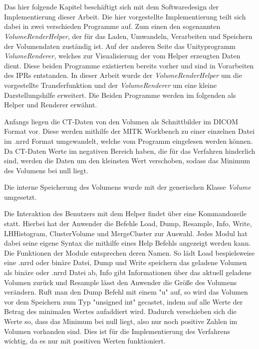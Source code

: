 \chapter{}
\label{sec:concept}



Das hier folgende Kapitel beschäftigt sich mit dem Softwaredesign der Implementierung dieser Arbeit.
\newline
Die hier vorgestellte Implementierung teilt sich dabei in zwei verschieden Programme auf. Zum einen den sogenannten \textit{VolumeRenderHelper}, der für das Laden, Umwandeln, Verarbeiten und Speichern der Volumendaten zuständig ist. Auf der anderen Seite das Unityprogramm \textit{VolumeRenderer}, welches zur Visualisierung der vom Helper erzeugten Daten dient. Diese beiden Programme existierten bereits vorher und sind in Vorarbeiten des IPRs entstanden. In dieser Arbeit wurde der \textit{VolumeRenderHelper} um die vorgestellte Transferfunktion und der \textit{VolumeRenderer} um eine kleine Darstellungshilfe erweitert. Die Beiden Programme werden im folgenden als Helper und Renderer erwähnt.

Anfangs liegen die CT-Daten von den Volumen als Schnittbilder im DICOM Format vor. Diese werden mithilfe der MITK Workbench zu einer einzelnen Datei im .nrrd Format umgewandelt, welche vom Programm eingelesen werden können.
Da CT-Daten Werte im negativen Bereich haben, die für  das Verfahren hinderlich sind, werden die Daten um den kleinsten Wert verschoben, sodass das Minimum des Volumens bei null liegt.


Die interne Speicherung des Volumens wurde mit der generischen Klasse \textit{Volume} umgesetzt. 



Die Interaktion des Benutzers mit dem Helper findet über eine Kommandozeile statt. Hierbei hat der Anwender die Befehle Load, Dump, Resample, Info, Write, LHHistogram, ClusterVolume und MergeCluster zur Auswahl. Jedes Modul hat dabei seine eigene Syntax die mithilfe eines Help Befehls angezeigt werden kann.
Die Funktionen der Module entsprechen deren Namen. So lädt Load bespielsweise eine .nrrd oder binäre Datei, Dump und Write speichern das geladene Volumen als binäre oder .nrrd Datei ab, Info gibt Informationen über das aktuell geladene Volumen zurück und Resample lässt den Anwender die Größe des Volumens verändern. Ruft man den Dump Befehl mit einem "u" auf, so wird das Volumen vor dem Speichern zum Typ "unsigned int" gecastet, indem auf alle Werte der Betrag des minimalen Wertes aufaddiert wird. Dadurch  verschieben sich die Werte so, dass das Minimum bei null liegt, also nur noch positive Zahlen im Volumen vorhanden sind. Dies ist für die Implementierung des Verfahrens wichtig, da es nur mit positiven Werten funktioniert.


